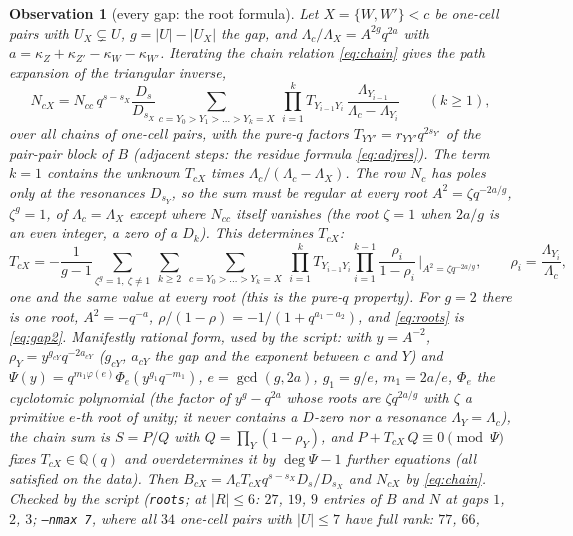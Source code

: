 \documentclass[11pt]{article}
\newtheorem{observation}{Observation}
\newcommand{\Lam}{\Lambda}
\newcommand{\LMPH}[1]{\texttt{#1}}
\begin{document}
\begin{observation}[every gap: the root formula]\label{obs:roots}
Let $X=\{W,W'\}<c$ be one-cell pairs with $U_X\subsetneq U$, $g=|U|-|U_X|$ the gap, and
$\Lam_c/\Lam_X=A^{2g}q^{2a}$ with $a=\kappa_Z+\kappa_{Z'}-\kappa_W-\kappa_{W'}$.  Iterating the chain relation
\eqref{eq:chain} gives the path expansion of the triangular inverse,
\begin{equation}\label{eq:paths}
N_{cX}=N_{cc}\,q^{s-s_X}\frac{D_s}{D_{s_X}}\sum_{c=Y_0>Y_1>\dots>Y_k=X}\ \prod_{i=1}^{k}T_{Y_{i-1}Y_i}\,
\frac{\Lam_{Y_{i-1}}}{\Lam_c-\Lam_{Y_i}}\qquad(k\ge1),
\end{equation}
over all chains of one-cell pairs, with the pure-$q$ factors $T_{YY'}=r_{YY'}q^{2s_{Y'}}$ of the pair-pair block of
$B$ (adjacent steps: the residue formula \eqref{eq:adjres}).  The term $k=1$ contains the unknown $T_{cX}$ times
$\Lam_c/(\Lam_c-\Lam_X)$.  The row $N_c$ has poles only at the resonances $D_{s_Y}$, so the sum must be regular at
every root $A^2=\zeta q^{-2a/g}$, $\zeta^g=1$, of $\Lam_c=\Lam_X$ except where $N_{cc}$ itself vanishes (the root
$\zeta=1$ when $2a/g$ is an even integer, a zero of a $D_k$).  This determines $T_{cX}$:
\begin{equation}\label{eq:roots}
T_{cX}=-\frac1{g-1}\sum_{\zeta^g=1,\ \zeta\ne1}\ \sum_{k\ge2}\ \sum_{c=Y_0>\dots>Y_k=X}\ \prod_{i=1}^{k}T_{Y_{i-1}Y_i}
\prod_{i=1}^{k-1}\frac{\rho_i}{1-\rho_i}\,\bigg|_{A^2=\zeta q^{-2a/g}},\qquad \rho_i=\frac{\Lam_{Y_i}}{\Lam_c},
\end{equation}
one and the same value at every root (this is the pure-$q$ property).  For $g=2$ there is one root, $A^2=-q^{-a}$,
$\rho/(1-\rho)=-1/(1+q^{a_1-a_2})$, and \eqref{eq:roots} is \eqref{eq:gap2}.  Manifestly rational form, used by the
script: with $y=A^{-2}$, $\rho_Y=y^{g_{cY}}q^{-2a_{cY}}$ ($g_{cY}$, $a_{cY}$ the gap and the exponent between $c$ and
$Y$) and $\Psi(y)=q^{m_1\varphi(e)}\Phi_e(y^{g_1}q^{-m_1})$, $e=\gcd(g,2a)$, $g_1=g/e$, $m_1=2a/e$, $\Phi_e$ the
cyclotomic polynomial (the factor of $y^g-q^{2a}$ whose roots are $\zeta q^{2a/g}$ with $\zeta$ a primitive $e$-th
root of unity; it never contains a $D$-zero nor a resonance $\Lam_Y=\Lam_c$), the chain sum is $S=P/Q$ with
$Q=\prod_Y(1-\rho_Y)$, and $P+T_{cX}\,Q\equiv0\pmod\Psi$ fixes $T_{cX}\in\mathbb Q(q)$ and overdetermines it by
$\deg\Psi-1$ further equations (all satisfied on the data).  Then $B_{cX}=\Lam_cT_{cX}q^{s-s_X}D_s/D_{s_X}$ and
$N_{cX}$ by \eqref{eq:chain}.  Checked by the script (\LMPH{roots}; at $|R|\le6$: $27$, $19$, $9$ entries of $B$ and
$N$ at gaps $1$, $2$, $3$; \LMPH{--nmax 7}, where all $34$ one-cell pairs with $|U|\le7$ have full rank: $77$, $66$,

\end{observation}
\end{document}
